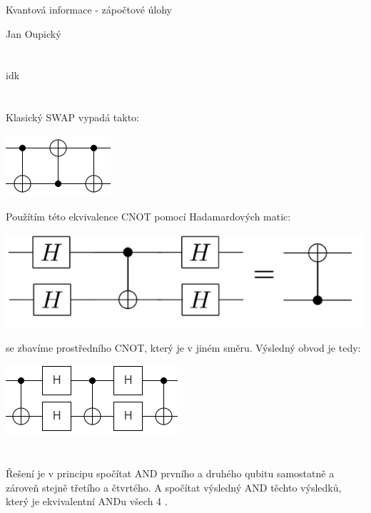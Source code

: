 \documentclass[12pt, a4paper]{article}
\begin{document}
\begin{center}
\large Kvantová informace - zápočtové úlohy

\normalsize Jan Oupický
\end{center}
\vspace{1\baselineskip}

\section{}
idk

\section{}
Klasický SWAP vypadá takto:\\
\begin{center}
\includegraphics{2/swap.png}
\end{center}
Použítím této ekvivalence CNOT pomocí Hadamardových matic:\\
\begin{center}
\includegraphics{2/hadamard.png}
\end{center}
se zbavíme prostředního CNOT, který je v jiném směru. Výsledný obvod je tedy:
\begin{center}
\includegraphics{2/final.png}
\end{center}

\section{}
Řešení je v principu spočítat AND prvního a druhého qubitu samostatně a zároveň stejně třetího a čtvrtého. A spočítat výsledný AND těchto výsledků, který je ekvivalentní ANDu všech 4 .
\end{document}
